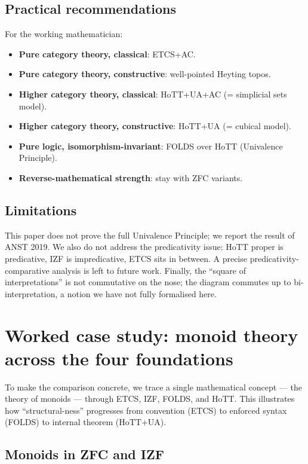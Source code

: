 \documentclass[12pt]{article}
\theoremstyle{definition}
\theoremstyle{remark}
\begin{document}
\subsection{Practical recommendations}

For the working mathematician:
\begin{itemize}
\item \textbf{Pure category theory, classical}: ETCS+AC.
\item \textbf{Pure category theory, constructive}: well-pointed Heyting topos.
\item \textbf{Higher category theory, classical}: HoTT+UA+AC (= simplicial sets model).
\item \textbf{Higher category theory, constructive}: HoTT+UA (= cubical model).
\item \textbf{Pure logic, isomorphism-invariant}: FOLDS over HoTT (Univalence Principle).
\item \textbf{Reverse-mathematical strength}: stay with ZFC variants.
\end{itemize}

\subsection{Limitations}

This paper does not prove the full Univalence Principle; we report the result of ANST
2019. We also do not address the predicativity issue: HoTT proper is predicative, IZF is
impredicative, ETCS sits in between. A precise predicativity-comparative analysis is
left to future work. Finally, the ``square of interpretations'' is not commutative on
the nose; the diagram commutes up to bi-interpretation, a notion we have not fully
formalised here.

\section{Worked case study: monoid theory across the four foundations}
\label{sec:casestudy}

To make the comparison concrete, we trace a single mathematical concept --- the theory
of monoids --- through ETCS, IZF, FOLDS, and HoTT. This illustrates how
``structural-ness'' progresses from convention (ETCS) to enforced syntax (FOLDS) to
internal theorem (HoTT+UA).

\subsection{Monoids in ZFC and IZF}
\end{document}
